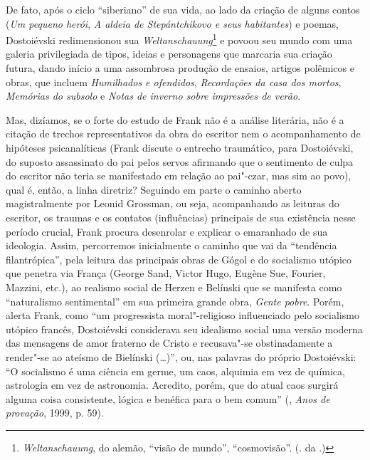 De fato, após o ciclo ``siberiano'' de sua vida, ao lado da criação de
alguns contos (\emph{Um pequeno herói}, \emph{A aldeia de Stepántchikovo
e seus habitantes}) e poemas, Dostoiévski redimensionou sua
\emph{Weltanschauung}\footnote{\emph{Weltanschauung}, do alemão, ``visão de mundo'', ``cosmovisão''. (. da .)} e povoou seu mundo com uma galeria privilegiada de
tipos, ideias e personagens que marcaria sua criação futura, dando
início a uma assombrosa produção de ensaios, artigos polêmicos e obras,
que incluem \emph{Humilhados e ofendidos}, \emph{Recordações da casa dos
mortos}, \emph{Memórias do subsolo} e \emph{Notas de inverno sobre
impressões de verão}.

Mas, dizíamos, se o forte do estudo de Frank não é a análise literária,
não é a citação de trechos representativos da obra do escritor nem o
acompanhamento de hipóteses psicanalíticas (Frank discute o entrecho
traumático, para Dostoiévski, do suposto assassinato do pai pelos servos
afirmando que o sentimento de culpa do escritor não teria se manifestado
em relação ao pai"-czar, mas sim ao povo), qual é, então, a linha
diretriz? Seguindo em parte o caminho aberto magistralmente por Leonid
Grossman, ou seja, acompanhando as leituras do escritor, os traumas e os
contatos (influências) principais de sua existência nesse período
crucial, Frank procura desenrolar e explicar o emaranhado de sua
ideologia. Assim, percorremos inicialmente o caminho que vai da
``tendência filantrópica'', pela leitura das principais obras de Gógol e
do socialismo utópico que penetra via França (George Sand, Victor Hugo,
Eugène Sue, Fourier, Mazzini, etc.), ao realismo social de Herzen e
Belínski que se manifesta como ``naturalismo sentimental'' em sua
primeira grande obra, \emph{Gente pobre}. Porém, alerta Frank, como ``um
progressista moral"-religioso influenciado pelo socialismo utópico
francês, Dostoiévski considerava seu idealismo social uma versão moderna
das mensagens de amor fraterno de Cristo e recusava"-se obstinadamente a
render"-se ao ateísmo de Bielínski (\ldots{})'', ou, nas palavras do
próprio Dostoiévski: ``O socialismo é uma ciência em germe, um caos,
alquimia em vez de química, astrologia em vez de astronomia. Acredito,
porém, que do atual caos surgirá alguma coisa consistente, lógica e
benéfica para o bem comum'' (, \emph{Anos de provação}, 1999, p. 59).

